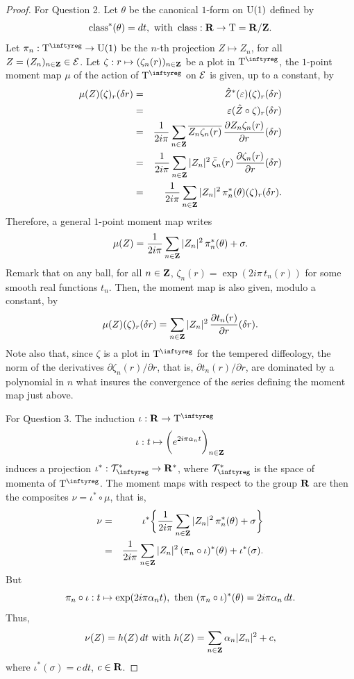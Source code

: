 \begin{proof}
  For Question 2.
  Let $\theta$ be the canonical $1$-form on $\mathrm{U}(1)$ defined by
  $$
    \operatorname{class}^*(\theta) = dt,
    \ \text{with}\ 
    \operatorname{class} : \mathbf{R} \to \mathrm{T} = \mathbf{R}/\mathbf{Z}.
    $$
  Let $\pi_n : \Torus^\infty \to \U(1)$ be the $n$-th projection $Z \mapsto  Z_n$, for all
  $Z= (Z_n)_{n\in\mathbf{Z}} \in \mathcal{E}$. Let $\zeta : r \mapsto(\zeta_n(r))_{n\in\mathbf{Z}}$ be a plot in $\Torus^\infty$,
  the $1$-point moment map $\mu$ of the action of $\Torus^\infty$ on $\mathcal{E}$ is given, up to a constant, by
  \begin{eqnarray*}
    \mu (Z)(\zeta)_r(\delta r) & = & \hat Z^*(\varepsilon)(\zeta)_r(\delta r) \\
    & = & \varepsilon(\hat Z \circ \zeta)_r(\delta r) \\
    & = &  {1 \over 2i\pi}\sum_{n\in\mathbf{Z}} \overline{Z_n \zeta_n(r)}\,{\partial  Z_n  \zeta_n(r) \over \partial r}(\delta r) \\
    & = &  {1 \over 2i\pi}\sum_{n\in\mathbf{Z}} \vert Z_n \vert^2 \, \bar \zeta_n(r)\,{\partial \zeta_n(r) \over \partial r}(\delta r) \\
    & = &  {1 \over 2i\pi}\sum_{n\in\mathbf{Z}} \vert Z_n \vert^2 \, \pi_n^*(\theta)(\zeta)_r(\delta r).
  \end{eqnarray*}
  Therefore, a general $1$-point moment map writes
  $$
    \mu (Z) =  {1 \over 2i\pi}\sum_{n\in\mathbf{Z}} \vert Z_n \vert^2 \, \pi_n^*(\theta) + \sigma.
    $$
  Remark that on any ball, for all $n\in\mathbf{Z}$, $\zeta_n(r) = \exp(2i\pi\, t_n(r))$ for some smooth real functions $t_n$.
  Then, the moment map is also given, modulo a constant, by
  $$
    \mu (Z)(\zeta)_r(\delta r) = \sum_{n\in\mathbf{Z}} \vert Z_n \vert^2 \, {\partial t_n(r) \over \partial r}(\delta r).
    $$
  Note also that, since $\zeta$ is a plot in $\Torus^\infty$ for the tempered diffeology,
  the norm of the derivatives $\partial \zeta_n(r) / \partial r$, that is,
  $\partial t_n(r) / \partial r$, are dominated by a polynomial in $n$ what insures the convergence of the series
  defining the moment map just above.
  
  For Question 3. The induction $\iota : \RR \to \Torus^\infty$
  $$
    \iota : t \mapsto \bigg(e^{2i\pi\alpha_n t}\bigg)_{n\in\mathbf{Z}}
    $$
  induces a projection $\iota^* : \cTorus_\infty^* \to \RR^*$,
  where $\cTorus_\infty^*$ is the space of momenta of $\Torus^\infty$.
  The moment maps with respect to the group $\mathbf{R}$ are then the composites $\nu = \iota^* \circ \mu$, that is,
  \begin{eqnarray*}
    \nu & = & \iota^*\bigg\{ {1 \over 2i\pi}\sum_{n\in\mathbf{Z}} \vert Z_n \vert^2 \, \pi_n^*(\theta) + \sigma \bigg\} \\
    & = & {1 \over 2i\pi}\sum_{n\in\mathbf{Z}} \vert Z_n \vert^2 \, (\pi_n\circ\iota)^*(\theta) + \iota^*(\sigma).
  \end{eqnarray*}
  But
  $$
    \pi_n\circ \iota : t \mapsto \exp(2i\pi \alpha_n t), \ \text{then}\  (\pi_n\circ\iota)^*(\theta) = 2i\pi \alpha_n\, dt.
    $$
  Thus,
  $$
    \nu (Z) = h (Z) \, dt \ \text{with}\  h (Z) = \sum_{n\in\mathbf{Z}} \alpha_n \vert Z_n \vert^2 + c,
    $$
  where $\iota^*(\sigma) = c\, dt$, $c \in \mathbf{R}$.
\end{proof}


